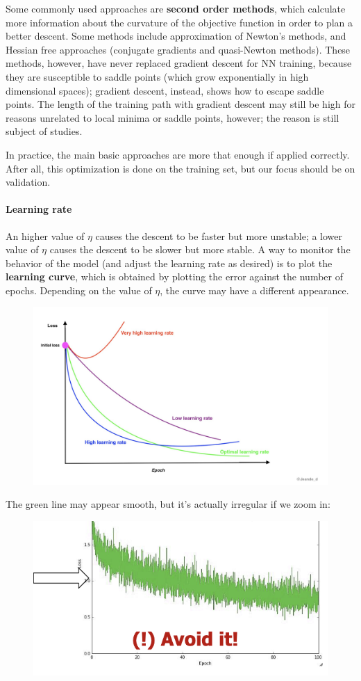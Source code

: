 Some commonly used approaches are \textbf{second order methods}, which calculate more information about the curvature of the objective function in order to plan a better descent. Some methods include approximation of Newton's methods, and Hessian free approaches (conjugate gradients and quasi-Newton methods). These methods, however, have never replaced gradient descent for NN training, because they are susceptible to saddle points (which grow exponentially in high dimensional spaces); gradient descent, instead, shows how to escape saddle points. The length of the training path with gradient descent may still be high for reasons unrelated to local minima or saddle points, however; the reason is still subject of studies. 

In practice, the main basic approaches are more that enough if applied correctly. After all, this optimization is done on the training set, but our focus should be on validation.

\paragraph{Learning rate}

An higher value of $\eta$ causes the descent to be faster but more unstable; a lower value of $\eta$ causes the descent to be slower but more stable. A way to monitor the behavior of the model (and adjust the learning rate as desired) is to plot the \textbf{learning curve}, which is obtained by plotting the error against the number of epochs. Depending on the value of $\eta$, the curve may have a different appearance.

\begin{figure}[ht]
    \centering
    \includegraphics[width=0.5\linewidth]{img/Learning curve and eta.png}
\end{figure}
The green line may appear smooth, but it's actually irregular if we zoom in:
\begin{figure}[ht]
    \centering
    \includegraphics[width=0.5\linewidth]{img/immagine.png}
\end{figure}

